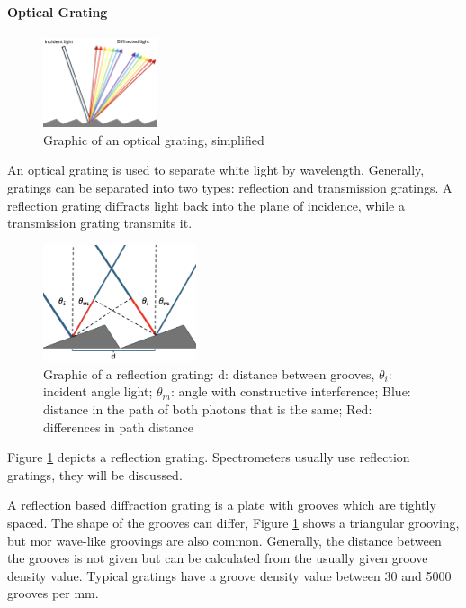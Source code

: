 \paragraph{Optical Grating}

\begin{figure} %
    \centering
    \includegraphics[width=0.3\textwidth]{images/setup_graphics/optical_grating.png}
    \caption{Graphic of an optical grating, simplified}
    \label{fig:grating}
    \vspace{-20pt}
\end{figure}

An optical grating is used to separate white light by wavelength. Generally, gratings can be separated into two types: reflection and transmission gratings. A reflection grating diffracts light back into the plane of incidence, while a transmission grating transmits it. 
\begin{figure}
    \centering
    \includegraphics[width=0.4\textwidth]{images/setup_graphics/grating_graphic.png}
    \caption{Graphic of a reflection grating: d: distance between grooves, \(\theta_i\): incident angle light; \(\theta_m\): angle with constructive interference; Blue: distance in the path of both photons that is the same; Red: differences in path distance}
    \label{fig:grating_graphic}
\end{figure}
Figure \ref{fig:grating} depicts a reflection grating. Spectrometers usually use reflection gratings, they will be discussed.

\bigskip

A reflection based diffraction grating is a plate with grooves which are tightly spaced. The shape of the grooves can differ, Figure \ref{fig:grating} shows a triangular grooving, but mor wave-like groovings are also common. Generally, the distance between the grooves is not given but can be calculated from the usually given groove density value. Typical gratings have a groove density value between 30 and 5000 grooves per mm.

